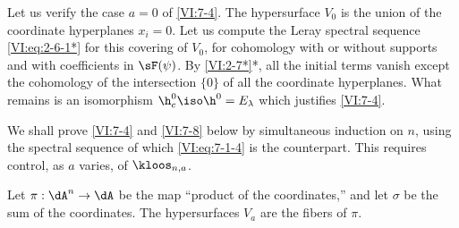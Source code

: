Let us verify the case $a=0$ of \ref{VI:7-4}. The hypersurface $V_0$ is the union 
of the coordinate hyperplanes $x_i=0$. Let us compute the Leray spectral sequence 
\eqref{VI:eq:2-6-1*} for this covering of $V_0$, for cohomology with or 
without supports and with coefficients in $\sF(\psi)$. By \ref{VI:2-7*}*, all 
the initial terms vanish except the cohomology of the intersection $\{0\}$ of 
all the coordinate hyperplanes. What remains is an isomorphism 
$\h_c^0{}\iso \h^0{}=E_\lambda$ which justifies \ref{VI:7-4}. 

We shall prove \ref{VI:7-4} and \ref{VI:7-8} below by simultaneous induction 
on $n$, using the spectral sequence of which 
\eqref{VI:eq:7-1-4} is the counterpart. This requires control, as $a$ varies, 
of $\kloos_{n,a}$. 

Let $\pi:\dA^n \to \dA$ be the map ``product of the coordinates,'' and let 
$\sigma$ be the sum of the coordinates. The hypersurfaces $V_a$ are the fibers of 
$\pi$.





